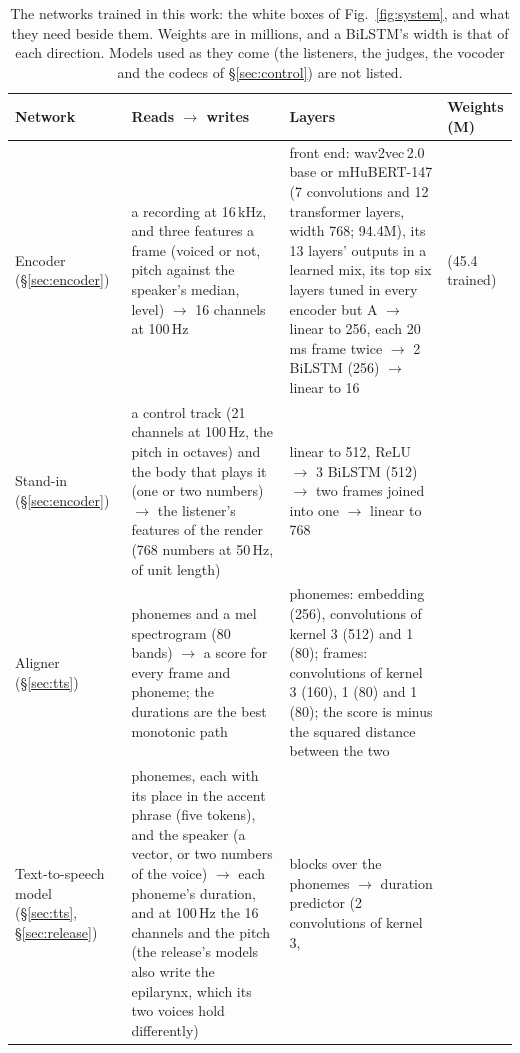 \documentclass[10pt,a4paper,twocolumn]{article}
\begin{document}
\begin{table}[t]
\centering\footnotesize\setlength{\tabcolsep}{4pt}
\caption{The networks trained in this work: the white boxes of Fig.~\ref{fig:system}, and what
they need beside them. Weights are in millions, and a BiLSTM's width is that of each direction.
Models used as they come (the listeners, the judges, the vocoder and the codecs of
\S\ref{sec:control}) are not listed.}
\label{tab:models}
\begin{tabular}{@{}>{\raggedright\arraybackslash}p{20mm}>{\raggedright\arraybackslash}p{56mm}>{\raggedright\arraybackslash}p{74mm}>{\raggedright\arraybackslash}p{17mm}@{}}
\toprule
Network & Reads $\rightarrow$ writes & Layers & Weights (M)\\
\midrule
Encoder (\S\ref{sec:encoder})
& a recording at 16\,kHz, and three features a frame (voiced or not, pitch against the
speaker's median, level) $\rightarrow$ 16 channels at 100\,Hz
& front end: wav2vec\,2.0 base or mHuBERT-147 (7 convolutions and 12 transformer layers,
width 768; 94.4M), its 13 layers' outputs in a learned mix, its top six layers tuned in every
encoder but A $\rightarrow$ linear to 256, each 20\,ms frame twice $\rightarrow$ 2 BiLSTM (256)
$\rightarrow$ linear to 16
& 97.2 (45.4 trained)\\
\addlinespace[2pt]
Stand-in (\S\ref{sec:encoder})
& a control track (21 channels at 100\,Hz, the pitch in octaves) and the body that plays it (one
or two numbers) $\rightarrow$ the listener's features of the render (768 numbers at 50\,Hz, of
unit length)
& linear to 512, ReLU $\rightarrow$ 3 BiLSTM (512) $\rightarrow$ two frames joined into one
$\rightarrow$ linear to 768
& 18.4\\
\addlinespace[2pt]
Aligner (\S\ref{sec:tts})
& phonemes and a mel spectrogram (80 bands) $\rightarrow$ a score for every frame and phoneme;
the durations are the best monotonic path
& phonemes: embedding (256), convolutions of kernel 3 (512) and 1 (80); frames: convolutions of
kernel 3 (160), 1 (80) and 1 (80); the score is minus the squared distance between the
two~\cite{ota}
& 0.5\\
\addlinespace[2pt]
Text-to-speech model (\S\ref{sec:tts}, \S\ref{sec:release})
& phonemes, each with its place in the accent phrase (five tokens), and the speaker (a vector,
or two numbers of the voice) $\rightarrow$ each phoneme's duration, and at 100\,Hz the 16
channels and the pitch (the release's models also write the epilarynx, which its two voices
hold differently)
& 4 blocks over the phonemes $\rightarrow$ duration predictor (2 convolutions of kernel 3,

\end{tabular}
\end{table}
\end{document}
